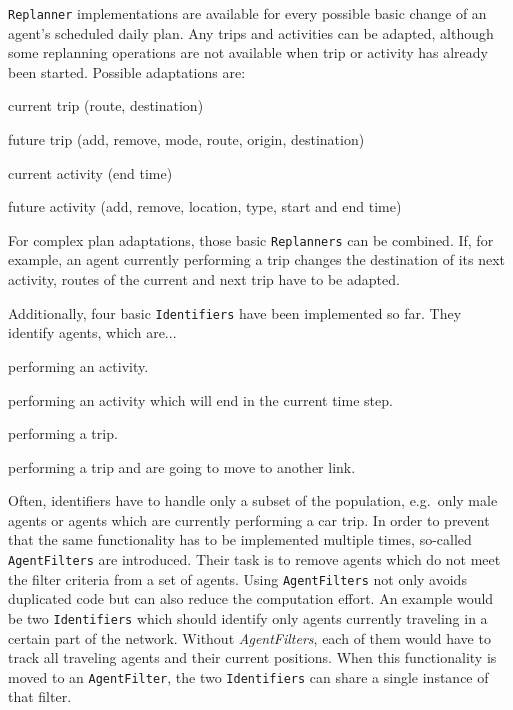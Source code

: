 
\lstinline{Replanner} implementations are available for every possible basic change of an agent's scheduled daily plan. Any trips and activities can be adapted, although some replanning operations are not available when trip or activity has already been started. Possible adaptations are:
\begin{compactitem}
    \item current trip (route, destination)
    \item future trip (add, remove, mode, route, origin, destination)
    \item current activity (end time)
    \item future activity (add, remove, location, type, start and end time)
\end{compactitem}
%
For complex plan adaptations, those basic \lstinline{Replanners} can be combined. If, for example, an agent currently performing a trip changes the destination of its next activity, routes of the current and next trip have to be adapted.


Additionally, four basic \lstinline{Identifiers} have been implemented so far. They identify agents, which are...
\begin{compactitem}
    \item performing an activity.
    \item performing an activity which will end in the current time step.
    \item performing a trip.
    \item performing a trip and are going to move to another link.
\end{compactitem}


Often, identifiers have to handle only a subset of the population, e.g.~only male agents or agents which are currently performing a car trip. In order to prevent that the same functionality has to be implemented multiple times, so-called \lstinline{AgentFilters} are introduced. Their task is to remove agents which do not meet the filter criteria from a set of agents. Using \lstinline{AgentFilters} not only avoids duplicated code but can also reduce the computation effort. An example would be two \lstinline{Identifiers} which should identify only agents currently traveling in a certain part of the network. Without \textit{AgentFilters}, each of them would have to track all traveling agents and their current positions. When this functionality is moved to an \lstinline{AgentFilter}, the two \lstinline{Identifiers} can share a single instance of that filter.

